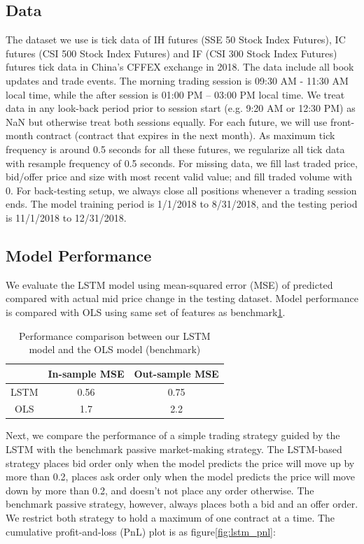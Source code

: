 \documentclass{article}
\begin{document}
\subsection{Data}

The dataset we use is tick data of IH futures (SSE 50 Stock Index Futures), IC futures (CSI 500 Stock Index Futures) and IF (CSI 300 Stock Index Futures) futures tick data in China’s CFFEX exchange in 2018. The data include all book updates and trade events. The morning trading session is 09:30 AM - 11:30 AM local time, while the after session is 01:00 PM – 03:00 PM local time. We treat data in any look-back period prior to session start (e.g. 9:20 AM or 12:30 PM) as NaN but otherwise treat both sessions equally. For each future, we will use front-month contract (contract that expires in the next month). As maximum tick frequency is around 0.5 seconds for all these futures, we regularize all tick data with resample frequency of 0.5 seconds. For missing data, we fill last traded price, bid/offer price and size with most recent valid value; and fill traded volume with 0. For back-testing setup, we always close all positions whenever a trading session ends. The model training period is 1/1/2018 to 8/31/2018, and the testing period is 11/1/2018 to 12/31/2018.

\subsection{Model Performance}

We evaluate the LSTM model using mean-squared error (MSE) of predicted compared with actual mid price change in the testing dataset. Model performance is compared with OLS using same set of features as benchmark\ref{tab:perf}.

\begin{table}[h]
	\begin{center}
		\begin{tabular}{ | c | c | c | } 
			\hline
			& In-sample MSE & Out-sample MSE \\ 
			\hline
			LSTM &  0.56 & 0.75 \\ 
			OLS & 1.7 & 2.2 \\
			\hline
		\end{tabular}
	\end{center}
	\caption{Performance comparison between our LSTM model and the OLS model (benchmark)} \label{tab:perf}
\end{table}

Next, we compare the performance of a simple trading strategy guided by the LSTM with the benchmark passive market-making strategy. The LSTM-based strategy places bid order only when the model predicts the price will move up by more than 0.2, places ask order only when the model predicts the price will move down by more than 0.2, and doesn’t not place any order otherwise. The benchmark passive strategy, however, always places both a bid and an offer order. We restrict both strategy to hold a maximum of one contract at a time. The cumulative profit-and-loss (PnL) plot is as figure\ref{fig:lstm_pnl}:
\end{document}

